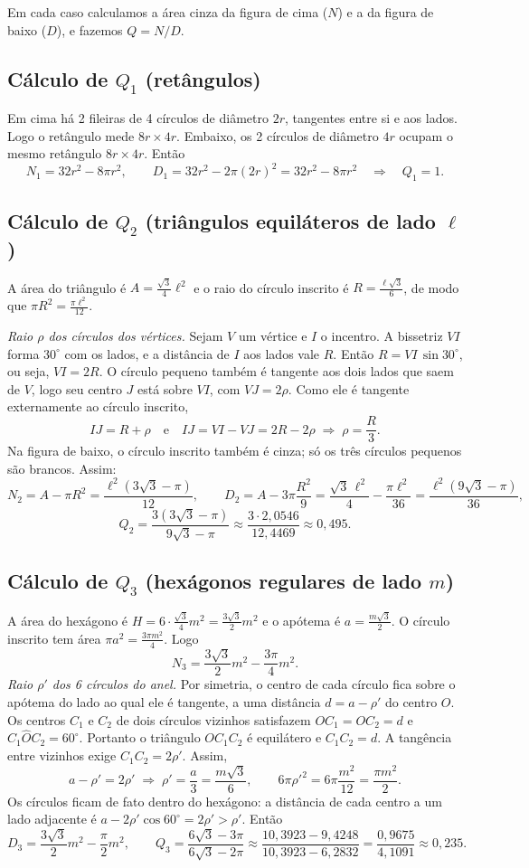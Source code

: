 \documentclass{article}%
\begin{document}
Em cada caso calculamos a área cinza da figura de cima ($N$) e a da figura de baixo ($D$), e fazemos $Q=N/D$.

\subsection*{Cálculo de $Q_1$ (retângulos)}
Em cima há 2 fileiras de 4 círculos de diâmetro $2r$, tangentes entre si e aos lados. Logo o retângulo mede $8r\times 4r$. Embaixo, os 2 círculos de diâmetro $4r$ ocupam o mesmo retângulo $8r\times 4r$. Então
\[
N_1=32r^2-8\pi r^2,\qquad D_1=32r^2-2\pi(2r)^2=32r^2-8\pi r^2
\quad\Longrightarrow\quad Q_1=1 .
\]

\subsection*{Cálculo de $Q_2$ (triângulos equiláteros de lado $\ell$)}
A área do triângulo é $A=\frac{\sqrt3}{4}\ell^2$ e o raio do círculo inscrito é $R=\frac{\ell\sqrt3}{6}$, de modo que $\pi R^2=\frac{\pi\ell^2}{12}$.

\emph{Raio $\rho$ dos círculos dos vértices.} Sejam $V$ um vértice e $I$ o incentro. A bissetriz $VI$ forma $30^\circ$ com os lados, e a distância de $I$ aos lados vale $R$. Então $R=VI\,\sin 30^\circ$, ou seja, $VI=2R$. O círculo pequeno também é tangente aos dois lados que saem de $V$, logo seu centro $J$ está sobre $VI$, com $VJ=2\rho$. Como ele é tangente externamente ao círculo inscrito,
\[
IJ=R+\rho \quad\text{e}\quad IJ=VI-VJ=2R-2\rho\;\Longrightarrow\;\rho=\frac{R}{3}.
\]
Na figura de baixo, o círculo inscrito também é cinza; só os três círculos pequenos são brancos. Assim:
\[
N_2=A-\pi R^2=\frac{\ell^2(3\sqrt3-\pi)}{12},\qquad
D_2=A-3\pi\frac{R^2}{9}=\frac{\sqrt3\,\ell^2}{4}-\frac{\pi\ell^2}{36}=\frac{\ell^2(9\sqrt3-\pi)}{36},
\]
\[
Q_2=\frac{3(3\sqrt3-\pi)}{9\sqrt3-\pi}\approx\frac{3\cdot 2{,}0546}{12{,}4469}\approx 0{,}495 .
\]

\subsection*{Cálculo de $Q_3$ (hexágonos regulares de lado $m$)}
A área do hexágono é $H=6\cdot\frac{\sqrt3}{4}m^2=\frac{3\sqrt3}{2}m^2$ e o apótema é $a=\frac{m\sqrt3}{2}$. O círculo inscrito tem área $\pi a^2=\frac{3\pi m^2}{4}$. Logo
\[
N_3=\frac{3\sqrt3}{2}m^2-\frac{3\pi}{4}m^2 .
\]
\emph{Raio $\rho'$ dos 6 círculos do anel.} Por simetria, o centro de cada círculo fica sobre o apótema do lado ao qual ele é tangente, a uma distância $d=a-\rho'$ do centro $O$. Os centros $C_1$ e $C_2$ de dois círculos vizinhos satisfazem $OC_1=OC_2=d$ e $C_1\hat{O}C_2=60^\circ$. Portanto o triângulo $OC_1C_2$ é equilátero e $C_1C_2=d$. A tangência entre vizinhos exige $C_1C_2=2\rho'$. Assim,
\[
a-\rho'=2\rho'\;\Longrightarrow\;\rho'=\frac a3=\frac{m\sqrt3}{6},\qquad 6\pi\rho'^2=6\pi\frac{m^2}{12}=\frac{\pi m^2}{2}.
\]
Os círculos ficam de fato dentro do hexágono: a distância de cada centro a um lado adjacente é $a-2\rho'\cos 60^\circ=2\rho'>\rho'$. Então
\[
D_3=\frac{3\sqrt3}{2}m^2-\frac{\pi}{2}m^2,\qquad
Q_3=\frac{6\sqrt3-3\pi}{6\sqrt3-2\pi}\approx\frac{10{,}3923-9{,}4248}{10{,}3923-6{,}2832}=\frac{0{,}9675}{4{,}1091}\approx 0{,}235 .
\]
\end{document}
